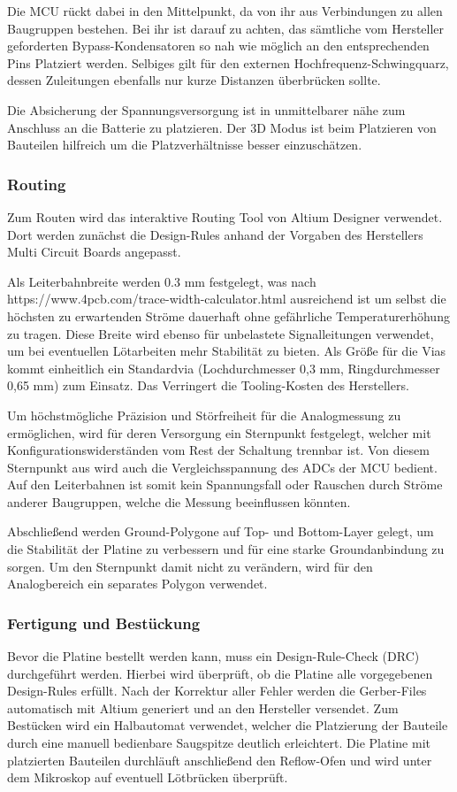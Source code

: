 Die MCU rückt dabei in den Mittelpunkt, da von ihr aus Verbindungen zu allen Baugruppen bestehen. Bei ihr ist darauf zu achten, das sämtliche vom Hersteller geforderten Bypass-Kondensatoren so nah wie möglich an den entsprechenden Pins Platziert werden. Selbiges gilt für den externen Hochfrequenz-Schwingquarz, dessen Zuleitungen ebenfalls nur kurze Distanzen überbrücken sollte.

Die Absicherung der Spannungsversorgung ist in unmittelbarer nähe zum Anschluss an die Batterie zu platzieren. Der 3D Modus ist beim Platzieren von Bauteilen hilfreich um die Platzverhältnisse besser einzuschätzen.


\subsubsection{Routing}
Zum Routen wird das interaktive Routing Tool von Altium Designer verwendet. Dort werden zunächst die Design-Rules anhand der Vorgaben des Herstellers Multi Circuit Boards angepasst.

Als Leiterbahnbreite werden 0.3 mm festgelegt, was nach https://www.4pcb.com/trace-width-calculator.html ausreichend ist um selbst die höchsten zu erwartenden Ströme dauerhaft ohne gefährliche Temperaturerhöhung zu tragen. Diese Breite wird ebenso für unbelastete Signalleitungen verwendet, um bei eventuellen Lötarbeiten mehr Stabilität zu bieten. Als Größe für die Vias kommt einheitlich ein Standardvia (Lochdurchmesser 0,3 mm, Ringdurchmesser 0,65 mm) zum Einsatz. Das Verringert die Tooling-Kosten des Herstellers.

Um höchstmögliche Präzision und Störfreiheit für die Analogmessung zu ermöglichen, wird für deren Versorgung ein Sternpunkt festgelegt, welcher mit Konfigurationswiderständen vom Rest der Schaltung trennbar ist. Von diesem Sternpunkt aus wird auch die Vergleichsspannung des ADCs der MCU bedient. Auf den Leiterbahnen ist somit kein Spannungsfall oder Rauschen durch Ströme anderer Baugruppen, welche die Messung beeinflussen könnten. 

Abschließend werden Ground-Polygone auf Top- und Bottom-Layer gelegt, um die Stabilität der Platine zu verbessern und für eine starke Groundanbindung zu sorgen. Um den Sternpunkt damit nicht zu verändern, wird für den Analogbereich ein separates Polygon verwendet.



\subsubsection{Fertigung und Bestückung}
Bevor die Platine bestellt werden kann, muss ein Design-Rule-Check (DRC) durchgeführt werden. Hierbei wird überprüft, ob die Platine alle vorgegebenen Design-Rules erfüllt. Nach der Korrektur aller Fehler werden die Gerber-Files automatisch mit Altium generiert und an den Hersteller versendet.
Zum Bestücken wird ein Halbautomat verwendet, welcher die Platzierung der Bauteile durch eine manuell bedienbare Saugspitze deutlich erleichtert. Die Platine mit platzierten Bauteilen durchläuft anschließend den Reflow-Ofen und wird unter dem Mikroskop auf eventuell Lötbrücken überprüft.

